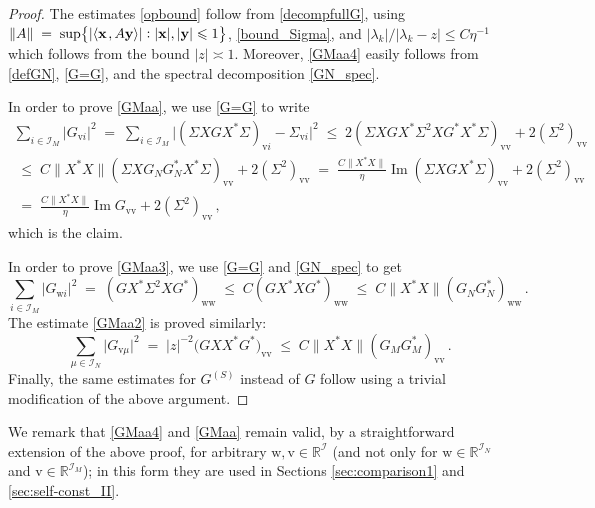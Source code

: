 \documentclass[11pt]{article} %
\numberwithin{equation}{section}
\numberwithin{figure}{section}
\theoremstyle{plain} %
\theoremstyle{definition} %
\newcommand{\f}[1]{\boldsymbol{\mathrm{#1}}} %
\renewcommand{\cal}{\mathcal}
\newcommand{\R}{\mathbb{R}}
\newcommand{\col}{\mathrel{\vcenter{\baselineskip0.75ex \lineskiplimit0pt \hbox{.}\hbox{.}}}}
\renewcommand{\leq}{\leqslant}
\newcommand{\pb}[1]{\bigl({#1}\bigr)}
\newcommand{\hb}[1]{\bigl\{{#1}\bigr\}}
\newcommand{\abs}[1]{\lvert #1 \rvert}
\newcommand{\absb}[1]{\bigl\lvert #1 \bigr\rvert}
\newcommand{\norm}[1]{\lVert #1 \rVert}
\newcommand{\scalar}[2]{\langle{#1} \mspace{2mu}, {#2}\rangle}
\DeclareMathOperator{\im}{Im}
\begin{document}
\begin{proof}


The estimates \eqref{opbound} follow from \eqref{decompfullG}, using $\norm{A} \;=\; \sup \hb{\abs{\scalar{\f x}{A \f y}} \col \abs{\f x}, \abs{\f y} \leq 1}$, \eqref{bound_Sigma}, and $\abs{\lambda_k}/{\abs{\lambda_k - z}} \leq C \eta^{-1}$ which follows from the bound $\abs{z} \asymp 1$. Moreover, \eqref{GMaa4} easily follows from \eqref{defGN}, \eqref{G=G}, and the spectral decomposition \eqref{GN_spec}.

In order to prove \eqref{GMaa}, we use \eqref{G=G} to write
\begin{multline*}
\sum_{i \in \cal I_M} \abs{G_{\f v i}}^2 \;=\; \sum_{i \in \cal I_M} \absb{(\Sigma X G X^* \Sigma)_{\f v i} - \Sigma_{\f vi}}^2
\;\leq\; 2 (\Sigma X G X^* \Sigma^2 X G^* X^* \Sigma)_{\f v \f v} + 2 (\Sigma^2)_{\f v \f v}
\\
\;\leq\; C \norm{X^* X} (\Sigma X G_N G_N^* X^* \Sigma)_{\f v \f v} + 2 (\Sigma^2)_{\f v \f v}
\;=\; \frac{C \norm{X^* X}}{\eta} \im (\Sigma X G X^* \Sigma)_{\f v \f v} + 2 (\Sigma^2)_{\f v \f v}
\\
\;=\; \frac{C \norm{X^* X}}{\eta} \im G_{\f v \f v} + 2 (\Sigma^2)_{\f v \f v}\,,
\end{multline*}
which is the claim.



In order to prove \eqref{GMaa3}, we use \eqref{G=G} and \eqref{GN_spec} to get
\begin{equation*}
\sum_{i \in \cal I_M} \abs{G_{\f w i}}^2 \;=\; (G X^* \Sigma^2 X G^*)_{\f w \f w} \;\leq\; C (G X^* X G^*)_{\f w \f w} \;\leq\; C \norm{X^* X} (G_N G^*_N)_{\f w \f w}\,.
\end{equation*}
The estimate \eqref{GMaa2} is proved similarly:
\begin{equation*}
\sum_{\mu \in \cal I_N} \abs{G_{\f v \mu}}^2 \;=\; \abs{z}^{-2} \pb{G XX^*G^*}_{\f v \f v} \;\leq\; C \norm{X^* X} (G_M G_M^*)_{\f v \f v}\,.
\end{equation*}
Finally, the same estimates for $G^{(S)}$ instead of $G$ follow using a trivial modification of the above argument.
\end{proof}

We remark that \eqref{GMaa4} and \eqref{GMaa} remain valid, by a straightforward extension of the above proof, for arbitrary $\f w, \f v \in \R^{\cal I}$ (and not only for $\f w \in \R^{\cal I_N}$ and $\f v \in \R^{\cal I_M}$); in this form they are used in Sections \ref{sec:comparison1} and \ref{sec:self-const_II}.
\end{document}
